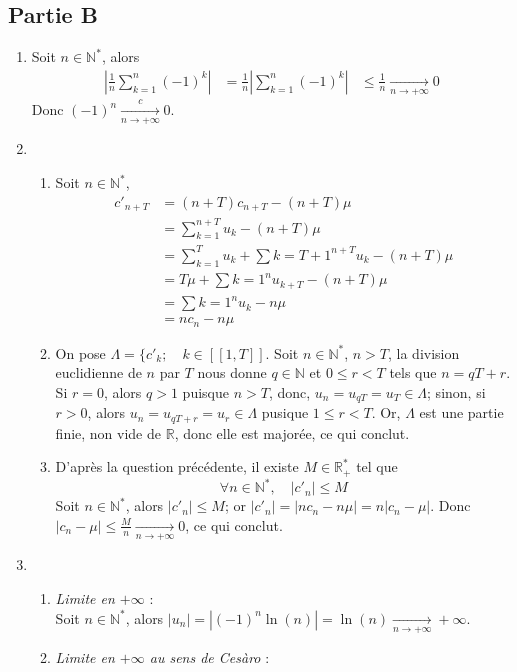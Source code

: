 \documentclass[17pt]{article}
\def\N{\mathbb N}
\def\R{\mathbb R}
\def\Rpe{\mathbb R_+^*}
\begin{document}
	\subsection*{Partie B}
	\begin{enumerate}[start=4]
		\item Soit $n\in\N^*$, alors 
		\begin{align*}
			\left|\frac1n\sum_{k=1}^n(-1)^k\right|  &= \frac1n\left|\sum_{k=1}^n(-1)^k\right|
													&\leq \frac1n\xrightarrow[n\rightarrow +\infty ]{}0
		\end{align*}
		Donc $\boxed{(-1)^n\xrightarrow[n\rightarrow +\infty ]{c}0}$.
		\item 
		\begin{enumerate}
			\item Soit $n\in\N^*$,
			\begin{align*}
				c'_{n+T} &= (n+T)c_{n+T}-(n+T)\mu\\
						 &= \sum_{k=1}^{n+T}u_k-(n+T)\mu\\
						 &= \sum_{k=1}^Tu_k+\sum{k=T+1}^{n+T}u_k-(n+T)\mu\\
						 &= T\mu+\sum{k=1}^nu_{k+T}-(n+T)\mu\\
						 &= \sum{k=1}^nu_k-n\mu\\
						 &= nc_n-n\mu
			\end{align*}
			\item On pose $\Lambda = \lbrace c'_k;\quad k\in[\![1,T]\!]$. Soit $n\in\N^*$, $n>T$, la division euclidienne de $n$ par $T$ nous donne $q\in\N$ et $0\leq r<T$ tels que $n=qT+r$. Si $r=0$, alors $q>1$ puisque $n>T$, donc, $u_n=u_{qT}=u_T\in\Lambda$; sinon, si $r>0$, alors $u_{n}=u_{qT+r}=u_{r}\in\Lambda$ pusique $1\leq r<T$. Or, $\Lambda$ est une partie finie, non vide de $\R$, donc elle est majorée, ce qui conclut.
			\item D'après la question précédente, il existe $M\in\Rpe$ tel que \[\forall n\in\N^*,\quad |c'_n|\leq M \]
			Soit $n\in \N^*$, alors $|c'_n|\leq M$; or $|c'_n|=|nc_n-n\mu|=n|c_n-\mu|$. Donc $|c_n-\mu|\leq \frac Mn\xrightarrow[n\rightarrow +\infty ]{}0$, ce qui conclut.
		\end{enumerate}
		\item 
		\begin{enumerate}
			\item \textit{Limite en $+\infty$} :\\
			Soit $n\in\N^*$, alors $\boxed{|u_n|=|(-1)^n\ln(n)|=\ln(n)\xrightarrow[n\rightarrow +\infty ]{}+\infty}$.
			\item \textit{Limite en $+\infty$ au sens de Cesàro} :\\

\end{enumerate}
\end{enumerate}
\end{document}
